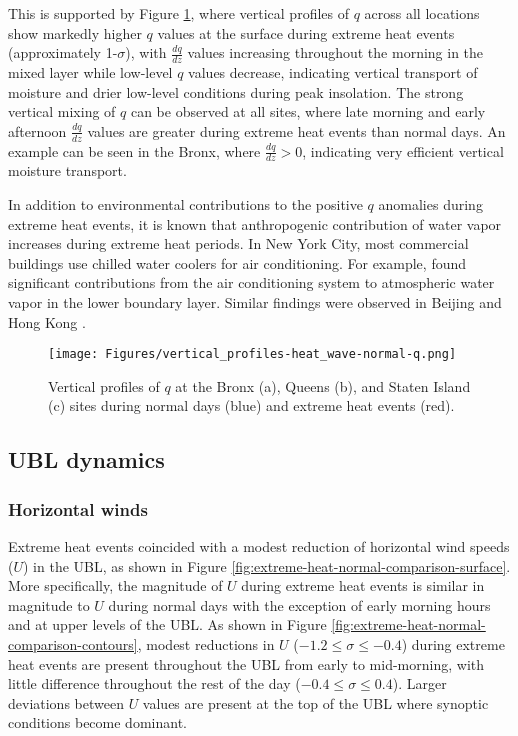 This is supported by Figure \ref{fig:vertical_profiles-heat_wave-normal-q}, where vertical profiles of $q$ across all locations show markedly higher $q$ values at the surface during extreme heat events (approximately 1-$\sigma$), with $\frac{dq}{dz}$ values increasing throughout the morning in the mixed layer while low-level $q$ values decrease, indicating vertical transport of moisture and drier low-level conditions during peak insolation. The strong vertical mixing of $q$ can be observed at all sites, where late morning and early afternoon $\frac{dq}{dz}$ values are greater during extreme heat events than normal days. An example can be seen in the Bronx, where $\frac{dq}{dz} > 0$, indicating very efficient vertical moisture transport. 

In addition to environmental contributions to the positive $q$ anomalies during extreme heat events, it is known that anthropogenic contribution of water vapor increases during extreme heat periods. In New York City, most commercial buildings use chilled water coolers for air conditioning. For example, \citet{gutierrez2015} found significant contributions from the air conditioning system to atmospheric water vapor in the lower boundary layer. Similar findings were observed in Beijing \citep{yu2019} and Hong Kong \citep{wang2018}.

\begin{figure}[ht]
	\centering
	\texttt{[image: Figures/vertical\_profiles-heat\_wave-normal-q.png]}
	\caption{Vertical profiles of $q$ at the Bronx (a), Queens (b), and Staten Island (c) sites during normal days (blue) and extreme heat events (red).}
	\label{fig:vertical_profiles-heat_wave-normal-q}
\end{figure}

\FloatBarrier

\subsection{UBL dynamics}

\subsubsection{Horizontal winds}
Extreme heat events coincided with a modest reduction of horizontal wind speeds ($U$) in the UBL, as shown in Figure \ref{fig:extreme-heat-normal-comparison-surface}. More specifically, the magnitude of $U$ during extreme heat events is similar in magnitude to $U$ during normal days with the exception of early morning hours and at upper levels of the UBL. As shown in Figure \ref{fig:extreme-heat-normal-comparison-contours}, modest reductions in $U$ ($-1.2 \leq \sigma \leq -0.4$) during extreme heat events are present throughout the UBL from early to mid-morning, with little difference throughout the rest of the day ($-0.4 \leq \sigma \leq 0.4$). Larger deviations between $U$ values are present at the top of the UBL where synoptic conditions become dominant.

